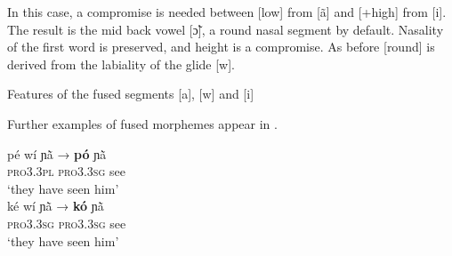 \documentclass[output=paper]{langscibook}
\begin{document}
In this case, a compromise is needed between [low] from [ã] and [+high] from [i]. The result is the mid back vowel [ɔ̃], a round nasal segment by default. Nasality of the first word is preserved, and height is a compromise. As before [round] is derived from the labiality of the glide [w]. 

\begin{exe}
  \ex Features of the fused segments [a], [w] and [i]\\
 \end{exe}
 
Further examples of fused morphemes appear in . 

\begin{exe}
    \ex \label{ex:traore:38}
        \begin{xlist}
            \ex \gll pé               wí               ɲã̀                 →          \textbf{pó}   ɲã̀\\  
                  \textsc{pro3.3pl}     \textsc{pro3.3sg}    see             {}             {}      {}\\
                  \trans `they have seen him'\\
             \ex \gll ké              wí              ɲã̀                 →          \textbf{kó}    ɲã̀\\
                   \textsc{pro3.3sg}     \textsc{pro3.3sg}    see       {}          {}          {}\\
                \trans `they have seen him'\\
    \end{xlist}
 \end{exe}
\end{document}
